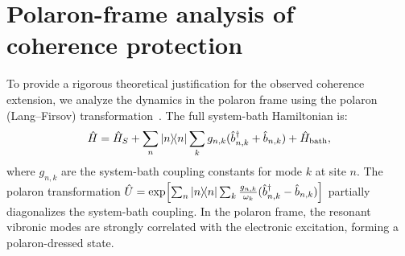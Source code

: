 \documentclass[11pt,a4paper]{article}
\begin{document}




\section{Polaron-frame analysis of coherence protection}
\label{sec:S7}

To provide a rigorous theoretical justification for the observed coherence extension, we analyze the dynamics in the polaron frame using the polaron (Lang--Firsov) transformation~\cite{Huelga2013,Chin2011}. The full system-bath Hamiltonian is:
\begin{equation}
\hat{H} = \hat{H}_S + \sum_n \dyad{n} \sum_k g_{n,k}(\hat{b}_{n,k}^\dagger + \hat{b}_{n,k}) + \hat{H}_{\mathrm{bath}},
\label{eq:SI_full_hamiltonian}
\end{equation}
where $g_{n,k}$ are the system-bath coupling constants for mode $k$ at site $n$. The polaron transformation $\hat{U} = \exp\!\left[\sum_n \dyad{n} \sum_k \frac{g_{n,k}}{\omega_k}(\hat{b}_{n,k}^\dagger - \hat{b}_{n,k})\right]$ partially diagonalizes the system-bath coupling. In the polaron frame, the resonant vibronic modes are strongly correlated with the electronic excitation, forming a polaron-dressed state.
\end{document}
